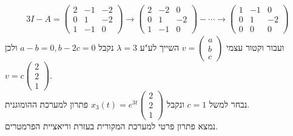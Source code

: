 \documentclass{article}
\begin{document}
\begin{align*}
    3I-A=\begin{pmatrix}
             2 & -1 & -2 \\
             0 & 1  & -2 \\
             1 & -1 & 0
         \end{pmatrix}\rightarrow \begin{pmatrix}
                                      2 & -2 & 0  \\
                                      0 & 1  & -2 \\
                                      1 & -1 & 0
                                  \end{pmatrix}-\cdots\rightarrow \begin{pmatrix}
                                                                      1 & -1 & 0  \\
                                                                      0 & 1  & -2 \\
                                                                      0 & 0  & 0
                                                                  \end{pmatrix}
\end{align*}
ועבור וקטור עצמי $v=\begin{pmatrix}
        a \\
        b \\
        c
    \end{pmatrix}$ השייך לע"ע $\lambda=3$ נקבל $a-b=0, b-2c=0$ ולכן $v=c\begin{pmatrix}
        2 \\
        2 \\
        1
    \end{pmatrix}$. \\ נבחר למשל $c=1$ ונקבל $x_3(t)=e^{3t}\begin{pmatrix}
        2 \\
        2 \\
        1
    \end{pmatrix}$ פתרון למערכת ההומוגנית.\\
נמצא פתרון פרטי למערכת המקורית בעזרת וריאציית הפרמטרים.
\end{document}

